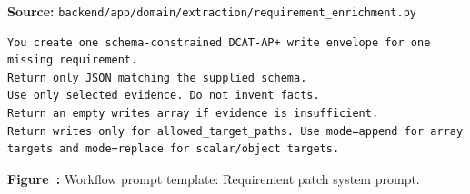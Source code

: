 \noindent\textbf{Source:} \texttt{backend/app/domain/extraction/requirement\_enrichment.py}
\begin{lstlisting}[style=workflowPromptListing]
You create one schema-constrained DCAT-AP+ write envelope for one missing requirement.
Return only JSON matching the supplied schema.
Use only selected evidence. Do not invent facts.
Return an empty writes array if evidence is insufficient.
Return writes only for allowed_target_paths. Use mode=append for array targets and mode=replace for scalar/object targets.
\end{lstlisting}
\label{fig:appendix-prompt-requirement-patch-system-prompt}
\noindent\textbf{Figure~\thefigure:} Workflow prompt template: Requirement patch system prompt.
\par\medskip

